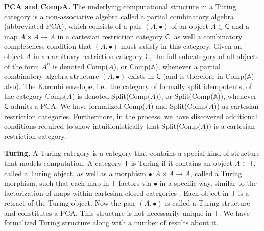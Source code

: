 \documentclass{entcs} \usepackage{entcsmacro}
\begin{document}
{\bfseries PCA and CompA.} The underlying computational structure in a Turing category is a non-associative algebra called a partial combinatory algebra (abbreviated PCA), which consists of a pair $(A, \bullet)$ of an object $A \in \mathsf{C}$ and a map $A \times A \to A$ in a cartesian restriction category $\mathsf{C}$, as well a combinatory completeness condition that $(A, \bullet)$ must satisfy in this category. Given an object $A$ in an arbitrary restriction category $\mathsf{C}$, the full subcategory of all objects of the form $A^n$ is denoted Comp($A$), or Comp($\mathbb{A}$), whenever a partial combinatory algebra structure $(A, \bullet)$ exists in $\mathsf{C}$ (and is therefore in Comp($\mathbb{A}$) also). The Karoubi envelope, i.e., the category of formally split idempotents, of the category Comp($A$) is denoted Split(Comp($A$)), or Split(Comp($\mathbb{A}$)), whenever $\mathsf{C}$ admits a PCA. We have formalized Comp($A$) and Split(Comp($A$)) as cartesian restriction categories. Furthermore, in the process, we have discovered additional conditions required to show intuitionistically that Split(Comp($A$)) is a cartesian restriction category. 

{\bfseries Turing.} A Turing category is a category that contains a special kind of structure that models computation. A category $\mathsf{T}$ is Turing if it contains an object $A \in \mathsf{T}$, called a Turing object, as well as a morphism $\bullet : A \times A \to A$, called a Turing morphism, such that each map in $\mathsf{T}$ factors via $\bullet$ in a specific way, similar to the factorization of maps within cartesian closed categories \cite{HOCL}. Each object in $\mathsf{T}$ is a retract of the Turing object. Now the pair $(A, \bullet)$ is called a Turing structure and constitutes a PCA. This structure is not necessarily unique in $\mathsf{T}$. We have formalized Turing structure along with a number of results about it.

	
	
\end{document}
